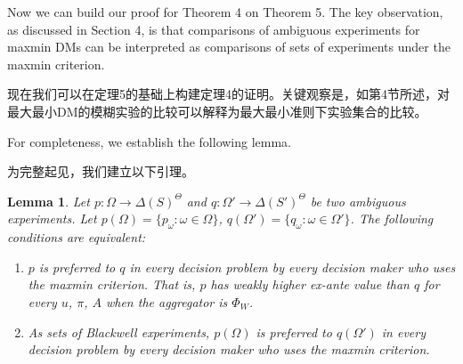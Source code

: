 \documentclass[12pt,a4paper]{article}
\newenvironment{original}
  {\par\vspace{4pt}\noindent\color{black}\ignorespaces}
  {\par\vspace{2pt}}
\newenvironment{translation}
  {\par\vspace{2pt}\noindent\color{myblue}\ignorespaces}
  {\par\vspace{6pt}}
\newtheorem{lemma}[theorem]{Lemma}
\newcommand{\Delt}{\Delta}
\begin{document}
\begin{original}
Now we can build our proof for Theorem 4 on Theorem 5. The key observation, as discussed in Section 4, is that comparisons of ambiguous experiments for maxmin DMs can be interpreted as comparisons of sets of experiments under the maxmin criterion.
\end{original}

\begin{translation}
现在我们可以在定理5的基础上构建定理4的证明。关键观察是，如第4节所述，对最大最小DM的模糊实验的比较可以解释为最大最小准则下实验集合的比较。
\end{translation}

\begin{original}
For completeness, we establish the following lemma.
\end{original}

\begin{translation}
为完整起见，我们建立以下引理。
\end{translation}

\begin{lemma}
Let $p:\Omega\to\Delt(S)^{\Theta}$ and $q:\Omega'\to\Delt(S')^{\Theta}$ be two ambiguous experiments. Let $p(\Omega)=\{p_{\omega}:\omega\in\Omega\}$, $q(\Omega')=\{q_{\omega}:\omega\in\Omega'\}$. The following conditions are equivalent:
\begin{enumerate}
    \item $p$ is preferred to $q$ in every decision problem by every decision maker who uses the maxmin criterion. That is, $p$ has weakly higher ex-ante value than $q$ for every $u$, $\pi$, $A$ when the aggregator is $\Phi_W$.
    \item As sets of Blackwell experiments, $p(\Omega)$ is preferred to $q(\Omega')$ in every decision problem by every decision maker who uses the maxmin criterion.
\end{enumerate}
\end{lemma}
\end{document}
